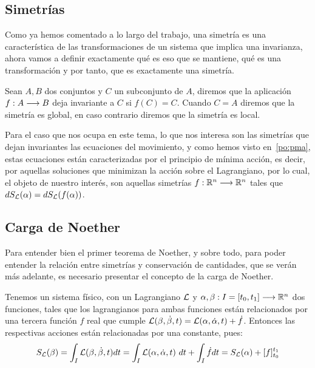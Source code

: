 \subsection{Simetrías}\label{sec:simetrias}
Como ya hemos comentado a lo largo del trabajo, una simetría es una característica de las transformaciones de un sistema que implica una invarianza, ahora vamos a definir exactamente qué es eso que se mantiene, qué es una transformación y por tanto, que es exactamente una simetría.

Sean $A, B$ dos conjuntos y $C$ un subconjunto de $A$, diremos que la aplicación $f:A\longrightarrow B$ deja invariante a $C$ si $f(C)=C$.
Cuando $C=A$ diremos que la simetría es global, en caso contrario diremos que la simetría es local.

Para el caso que nos ocupa en este tema, lo que nos interesa son las simetrías que dejan invariantes las ecuaciones del movimiento, y como hemos visto en~\eqref{po:pma}, estas ecuaciones están caracterizadas por el principio de mínima acción, es decir, por aquellas soluciones que minimizan la acción sobre el Lagrangiano, por lo cual, el objeto de nuestro interés, son aquellas simetrías $f:\mathbb{R}^n\longrightarrow \mathbb{R}^n$ tales que $dS_{\mathcal{L}}(\alpha)=dS_{\mathcal{L}}(f(\alpha))$.

\subsection{Carga de Noether}\label{sec:carga-de-noether}
Para entender bien el primer teorema de Noether, y sobre todo, para poder entender la relación entre simetrías y conservación de cantidades, que se verán más adelante, es necesario presentar el concepto de la carga de Noether.

Tenemos un sistema físico, con un Lagrangiano $\mathcal{L}$ y $\alpha,\beta:I=[t_0, t_1]\longrightarrow \mathbb{R}^n$ dos funciones, tales que los lagrangianos para ambas funciones están relacionados por una tercera función $f$ real que cumple $\mathcal{L}(\beta, \dot{\beta}, t) = \mathcal{L}(\alpha, \dot{\alpha}, t)+\dot{f}$.
Entonces las respectivas acciones están relacionadas por una constante, pues:
\begin{equation}
	\label{eq:variacion-accion}
	S_{\mathcal{L}}(\beta) = \int_I \mathcal{L}(\beta, \dot{\beta}, t) dt = \int_I \mathcal{L}(\alpha, \dot{\alpha}, t)\ dt+\int_I \dot{f}dt=S_{\mathcal{L}}(\alpha) +[f]_{t_0}^{t_1}
\end{equation}

